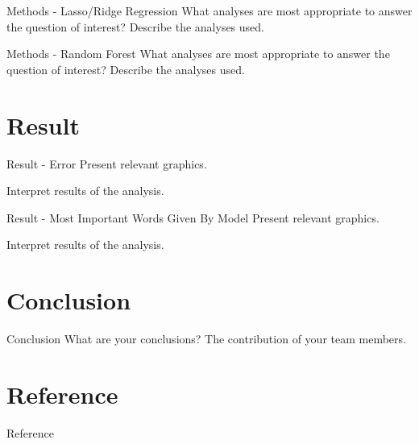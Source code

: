 \documentclass{beamer}
\begin{document}
\begin{frame}{Methods - Lasso/Ridge Regression}
  What analyses are most appropriate to answer the question of interest?
  Describe the analyses used.
\end{frame}

\begin{frame}{Methods - Random Forest}
  What analyses are most appropriate to answer the question of interest?
  Describe the analyses used.
\end{frame}

\section{Result}

\begin{frame}{Result - Error}
  Present relevant graphics.

  Interpret results of the analysis.
\end{frame}

\begin{frame}{Result - Most Important Words Given By Model}
  Present relevant graphics.

  Interpret results of the analysis.
\end{frame}

\section{Conclusion}

\begin{frame}{Conclusion}
  What are your conclusions? The contribution of your team members.
\end{frame}

\section*{Reference}
\begin{frame}[allowframebreaks]{Reference}
  \printbibliography
\end{frame}

\appendix
\end{document}
